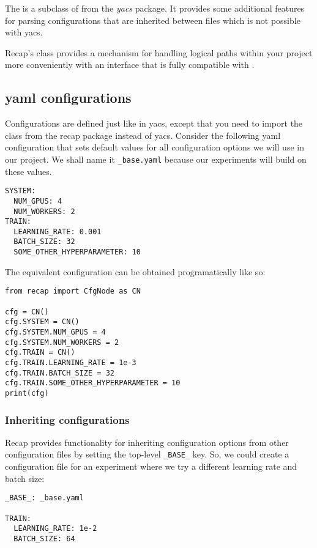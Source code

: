 \documentclass[../../report.tex]{subfiles}
\begin{document}
The  is a subclass of  from the \emph{yacs} package.
It provides some additional features for parsing configurations that are inherited between files which is not possible with yacs.

Recap's  class provides a mechanism for handling logical paths within your project more conveniently with an interface that is fully compatible with .

\subsection{\Acs{yaml} configurations}
Configurations are defined just like in yacs, except that you need to import the  class from the recap package instead of yacs.
Consider the following \gls{yaml} configuration that sets default values for all configuration options we will use in our project.
We shall name it \texttt{\_base.yaml} because our experiments will build on these values.
\begin{verbatim}
SYSTEM:
  NUM_GPUS: 4
  NUM_WORKERS: 2
TRAIN:
  LEARNING_RATE: 0.001
  BATCH_SIZE: 32
  SOME_OTHER_HYPERPARAMETER: 10
\end{verbatim}

The equivalent configuration can be obtained programatically like so:

\begin{verbatim}
from recap import CfgNode as CN

cfg = CN()
cfg.SYSTEM = CN()
cfg.SYSTEM.NUM_GPUS = 4
cfg.SYSTEM.NUM_WORKERS = 2
cfg.TRAIN = CN()
cfg.TRAIN.LEARNING_RATE = 1e-3
cfg.TRAIN.BATCH_SIZE = 32
cfg.TRAIN.SOME_OTHER_HYPERPARAMETER = 10
print(cfg)
\end{verbatim}

\subsubsection{Inheriting configurations}
Recap provides functionality for inheriting configuration options from other configuration files by setting the top-level \texttt{_BASE_} key.
So, we could create a configuration file  for an experiment where we try a different learning rate and batch size:

\begin{verbatim}
_BASE_: _base.yaml

TRAIN:
  LEARNING_RATE: 1e-2
  BATCH_SIZE: 64
\end{verbatim}
\end{document}
